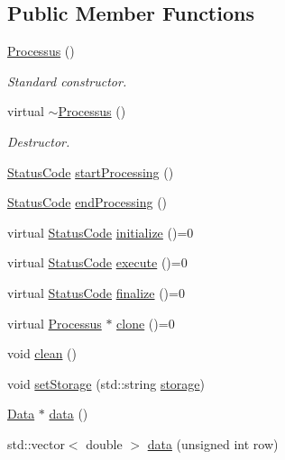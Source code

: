 \subsection*{Public Member Functions}
\begin{DoxyCompactItemize}
\item 
\hyperlink{classProcessus_a42ecb4626ba682ee10a313c83327a0f8}{Processus} ()
\begin{DoxyCompactList}\small\item\em Standard constructor. \end{DoxyCompactList}\item 
virtual \hyperlink{classProcessus_a3ec6c9d6ef9e7a6db07f66924561f2ee}{$\sim$\+Processus} ()
\begin{DoxyCompactList}\small\item\em Destructor. \end{DoxyCompactList}\item 
\hyperlink{classStatusCode}{Status\+Code} \hyperlink{classProcessus_a09319bde9bed93e290f69b4e04585543}{start\+Processing} ()
\item 
\hyperlink{classStatusCode}{Status\+Code} \hyperlink{classProcessus_a5e4da662989d356b89d490b89c7afbfd}{end\+Processing} ()
\item 
virtual \hyperlink{classStatusCode}{Status\+Code} \hyperlink{classProcessus_aee88ad7b77ae7319cf8b128e9dd2ea11}{initialize} ()=0
\item 
virtual \hyperlink{classStatusCode}{Status\+Code} \hyperlink{classProcessus_a63767a63a1fb0055c5aa45b21a4a5d58}{execute} ()=0
\item 
virtual \hyperlink{classStatusCode}{Status\+Code} \hyperlink{classProcessus_aba93d691f031bdb18ae4b8afb1b2e856}{finalize} ()=0
\item 
virtual \hyperlink{classProcessus}{Processus} $\ast$ \hyperlink{classProcessus_aca8856f6d6d7b7e1fe941f298dcbb502}{clone} ()=0
\item 
void \hyperlink{classProcessus_aaeb17673b98d2b39f3aa780e335e0968}{clean} ()
\item 
void \hyperlink{classProcessus_ad57a29b33f9021eda9f6929136f1784f}{set\+Storage} (std\+::string \hyperlink{classProcessus_a33fa1a0b54a636e5cdd680669fd9ea51}{storage})
\item 
\hyperlink{classData}{Data} $\ast$ \hyperlink{classProcessus_a16e45f329fbce935aeef0ff3cb508228}{data} ()
\item 
std\+::vector$<$ double $>$ \hyperlink{classProcessus_aa7c57483cf4b9ab0b2d0ae2de8316402}{data} (unsigned int row)

\end{DoxyCompactItemize}
